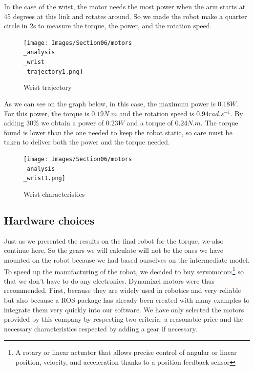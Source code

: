 In the case of the wrist, the motor needs the most power when the arm starts at 45 degrees at this link and rotates around. So we made the robot make a quarter circle in 2s to measure the torque, the power, and the rotation speed.

\begin{figure}[ht]
    \centering
    \texttt{[image: Images/Section06/motors\\\_analysis\\\_wrist\\\_trajectory1.png]}
    \caption{Wrist trajectory}
    \label{fig:WristTrajectory}
\end{figure}
\FloatBarrier

As we can see on the graph below, in this case, the maximum power is $0.18W$. For this power, the torque is $0.19N.m$ and the rotation speed is $0.94rad.s^{-1}$. By adding 30\% we obtain a power of $0.23W$ and a torque of $0.24N.m$. The torque found is lower than the one needed to keep the robot static, so care must be taken to deliver both the power and the torque needed.
\begin{figure}[ht]
    \centering
    \texttt{[image: Images/Section06/motors\\\_analysis\\\_wrist1.png]}
    \caption{Wrist characteristics}
    \label{fig:WristCharacteristics}
\end{figure}
\FloatBarrier

\subsection{Hardware choices}

Just as we presented the results on the final robot for the torque, we also continue here. So the gears we will calculate will not be the ones we have mounted on the robot because we had based ourselves on the intermediate model. To speed up the manufacturing of the robot, we decided to buy \gls{servomotor}\textcolor{SteelBlue}{s}\footnote{A rotary or linear actuator that allows precise control of angular or linear position, velocity, and acceleration thanks to a position feedback sensor} so that we don't have to do any electronics. Dynamixel \cite{Dynamixel} motors were thus recommended. First, because they are widely used in robotics and very reliable but also because a ROS package has already been created with many examples to integrate them very quickly into our software. We have only selected the motors provided by this company by respecting two criteria: a reasonable price and the necessary characteristics respected by adding a gear if necessary.

